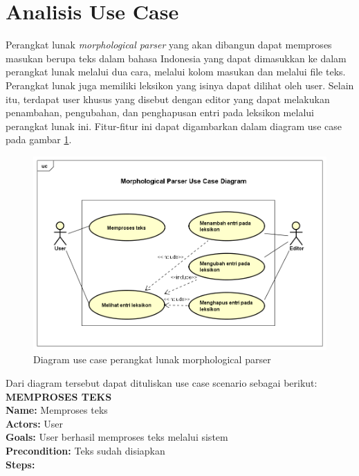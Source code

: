 \section{Analisis Use Case}
\label{sec:AnalisisUseCase}

Perangkat lunak \textit{morphological parser} yang akan dibangun dapat memproses masukan berupa teks dalam bahasa Indonesia yang dapat dimasukkan ke dalam perangkat lunak melalui dua cara, melalui kolom masukan dan melalui file teks. Perangkat lunak juga memiliki leksikon yang isinya dapat dilihat oleh user. Selain itu, terdapat user khusus yang disebut dengan editor yang dapat melakukan penambahan, pengubahan, dan penghapusan entri pada leksikon melalui perangkat lunak ini. Fitur-fitur ini dapat digambarkan dalam diagram use case pada gambar \ref{gambar-diagram-use-case}.
		
\begin{figure}[H]
\centering
\includegraphics[scale=0.56]{Gambar/gambar-diagram-use-case}
\caption[Diagram use case perangkat lunak morphological parser]{Diagram use case perangkat lunak morphological parser} 
\label{gambar-diagram-use-case}
\end{figure}

Dari diagram tersebut dapat dituliskan use case scenario sebagai berikut:\\

\textbf{MEMPROSES TEKS}\\
\textbf{Name:} Memproses teks\\
\textbf{Actors:} User\\
\textbf{Goals:} User berhasil memproses teks melalui sistem\\
\textbf{Precondition:} Teks sudah disiapkan\\
\textbf{Steps:}

